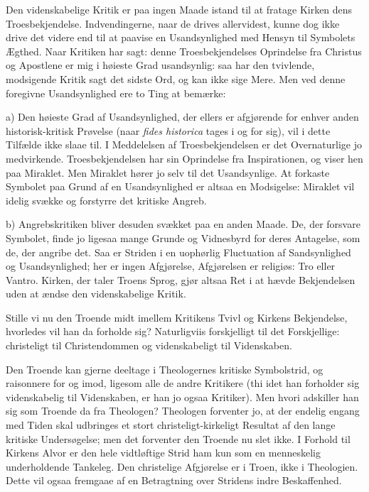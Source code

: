 \documentclass[12pt,a4paper]{book}
\newcommand{\opage}[1]{\marginnote{\footnotesize\textit{[#1]}}}
\begin{document}
Den videnskabelige Kritik er paa ingen Maade istand til at fratage Kirken dens
Troesbekjendelse. Indvendingerne, naar de drives allervidest, kunne dog ikke
drive det videre end til at paavise en Usandsynlighed med Hensyn til Symbolets
Ægthed. Naar Kritiken har sagt: denne Troesbekjendelses Oprindelse fra Christus
og Apostlene er mig i høieste Grad usandsynlig: saa har den tvivlende,
modsigende Kritik sagt det sidste Ord, og kan ikke sige
\opage{22} Mere. Men ved denne foregivne Usandsynlighed ere to Ting at bemærke:

a) Den høieste Grad af Usandsynlighed, der ellers er afgjørende for enhver
anden historisk-kritisk Prøvelse (naar \textit{fides historica} tages i og for
sig), vil i dette Tilfælde ikke slaae til. I Meddelelsen af Troesbekjendelsen
er det Overnaturlige jo medvirkende. Troesbekjendelsen har sin Oprindelse fra
Inspirationen, og viser hen paa Miraklet. Men Miraklet hører jo selv til det
Usandsynlige. At forkaste Symbolet paa Grund af en Usandsynlighed er altsaa en
Modsigelse: Miraklet vil idelig svække og forstyrre det kritiske Angreb.

b) Angrebskritiken bliver desuden svækket paa en anden Maade. De, der forsvare
Symbolet, finde jo ligesaa mange Grunde og Vidnesbyrd for deres Antagelse, som
de, der angribe det. Saa er Striden i en uophørlig Fluctuation af
Sandsynlighed og Usandsynlighed; her er ingen Afgjørelse, Afgjørelsen er
religiøs: Tro eller Vantro. Kirken, der taler Troens Sprog, gjør altsaa Ret i
at hævde Bekjendelsen uden at ændse den videnskabelige Kritik.

Stille vi nu den Troende midt imellem Kritikens Tvivl og Kirkens Bekjendelse,
hvorledes vil han da forholde sig? Naturligviis forskjelligt til det
Forskjellige: christeligt til Christendommen og videnskabeligt til Videnskaben.

Den Troende kan gjerne deeltage i Theologernes kritiske Symbolstrid, og
raisonnere for og imod, ligesom alle de andre Kritikere (thi idet han forholder
sig videnskabelig til Videnskaben, er han jo ogsaa Kritiker). Men hvori
adskiller han sig som Troende da fra Theologen? Theologen forventer jo, at der
endelig engang med Tiden skal udbringes et stort christeligt-kirkeligt Resultat
af den lange kritiske Undersøgelse; men det forventer den Troende nu slet ikke.
I Forhold til Kirkens Alvor er den hele vidtløftige Strid ham kun som en
menneskelig underholdende Tankeleg. Den christelige
\opage{23} Afgjørelse er i Troen, ikke i Theologien. Dette vil ogsaa fremgaae af en
Betragtning over Stridens indre Beskaffenhed.
\end{document}
